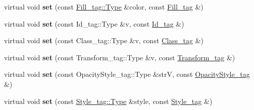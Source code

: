 \begin{DoxyCompactItemize}
\item 
\hypertarget{classsambag_1_1disco_1_1svg_1_1_svg_object_ab4bf18768e274d7382ac0bcc5603bbd8}{
virtual void {\bfseries set} (const \hyperlink{structsambag_1_1com_1_1_color_r_g_b_a}{Fill\_\-tag::Type} \&color, const \hyperlink{structsambag_1_1disco_1_1svg_1_1_svg_object_1_1_fill__tag}{Fill\_\-tag} \&)}
\label{classsambag_1_1disco_1_1svg_1_1_svg_object_ab4bf18768e274d7382ac0bcc5603bbd8}

\item 
\hypertarget{classsambag_1_1disco_1_1svg_1_1_svg_object_ad2017885db12ab1d9458a84edc4b46e8}{
virtual void {\bfseries set} (const Id\_\-tag::Type \&v, const \hyperlink{structsambag_1_1disco_1_1svg_1_1_svg_object_1_1_id__tag}{Id\_\-tag} \&)}
\label{classsambag_1_1disco_1_1svg_1_1_svg_object_ad2017885db12ab1d9458a84edc4b46e8}

\item 
\hypertarget{classsambag_1_1disco_1_1svg_1_1_svg_object_aa66af8a8c60d9f98e2c0a6a4dfba7bc8}{
virtual void {\bfseries set} (const Class\_\-tag::Type \&v, const \hyperlink{structsambag_1_1disco_1_1svg_1_1_svg_object_1_1_class__tag}{Class\_\-tag} \&)}
\label{classsambag_1_1disco_1_1svg_1_1_svg_object_aa66af8a8c60d9f98e2c0a6a4dfba7bc8}

\item 
\hypertarget{classsambag_1_1disco_1_1svg_1_1_svg_object_af1506089b38e309571c479b23ffa955b}{
virtual void {\bfseries set} (const Transform\_\-tag::Type \&v, const \hyperlink{structsambag_1_1disco_1_1svg_1_1_svg_object_1_1_transform__tag}{Transform\_\-tag} \&)}
\label{classsambag_1_1disco_1_1svg_1_1_svg_object_af1506089b38e309571c479b23ffa955b}

\item 
\hypertarget{classsambag_1_1disco_1_1svg_1_1_svg_object_a64543094101f6d88f5a9f308960af8b1}{
virtual void {\bfseries set} (const OpacityStyle\_\-tag::Type \&strV, const \hyperlink{structsambag_1_1disco_1_1svg_1_1_svg_object_1_1_opacity_style__tag}{OpacityStyle\_\-tag} \&)}
\label{classsambag_1_1disco_1_1svg_1_1_svg_object_a64543094101f6d88f5a9f308960af8b1}

\item 
\hypertarget{classsambag_1_1disco_1_1svg_1_1_svg_object_a53a96f9619375343fdbaf750ad12cc07}{
virtual void {\bfseries set} (const \hyperlink{classsambag_1_1disco_1_1graphic_elements_1_1_style}{Style\_\-tag::Type} \&style, const \hyperlink{structsambag_1_1disco_1_1svg_1_1_svg_object_1_1_style__tag}{Style\_\-tag} \&)}
\label{classsambag_1_1disco_1_1svg_1_1_svg_object_a53a96f9619375343fdbaf750ad12cc07}


\end{DoxyCompactItemize}
